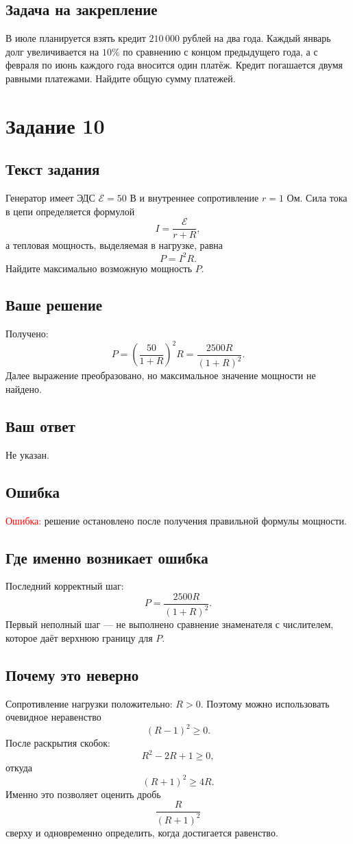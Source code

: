 \documentclass[12pt,a4paper]{article}
\begin{document}
\subsection*{Задача на закрепление}
В июле планируется взять кредит $210\,000$ рублей на два года. Каждый январь долг увеличивается на $10\%$ по сравнению с концом предыдущего года, а с февраля по июнь каждого года вносится один платёж. Кредит погашается двумя равными платежами. Найдите общую сумму платежей.

\newpage
{}\label{task:10}
\section*{Задание 10}

\subsection*{Текст задания}
Генератор имеет ЭДС $\mathcal E=50$ В и внутреннее сопротивление $r=1$ Ом. Сила тока в цепи определяется формулой
\[
I=\frac{\mathcal E}{r+R},
\]
а тепловая мощность, выделяемая в нагрузке, равна
\[
P=I^2R.
\]
Найдите максимально возможную мощность $P$.

\subsection*{Ваше решение}
Получено:
\[
P=\left(\frac{50}{1+R}\right)^2R
 =\frac{2500R}{(1+R)^2}.
\]
Далее выражение преобразовано, но максимальное значение мощности не найдено.

\subsection*{Ваш ответ}
Не указан.

\subsection*{Ошибка}
\textcolor{red}{Ошибка:} решение остановлено после получения правильной формулы мощности.

\subsection*{Где именно возникает ошибка}
Последний корректный шаг:
\[
P=\frac{2500R}{(1+R)^2}.
\]
Первый неполный шаг --- не выполнено сравнение знаменателя с числителем, которое даёт верхнюю границу для $P$.

\subsection*{Почему это неверно}
Сопротивление нагрузки положительно: $R>0$. Поэтому можно использовать очевидное неравенство
\[
(R-1)^2\ge 0.
\]
После раскрытия скобок:
\[
R^2-2R+1\ge 0,
\]
откуда
\[
(R+1)^2\ge 4R.
\]
Именно это позволяет оценить дробь
\[
\frac{R}{(R+1)^2}
\]
сверху и одновременно определить, когда достигается равенство.
\end{document}
